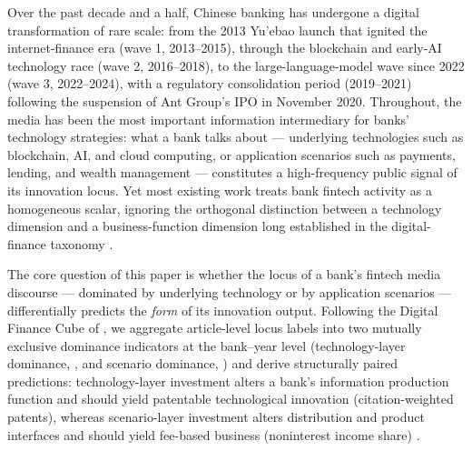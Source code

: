 Over the past decade and a half, Chinese banking has undergone a digital transformation
of rare scale: from the 2013 Yu'ebao launch that ignited the internet-finance era (wave
1, 2013--2015), through the blockchain and early-AI technology race (wave 2, 2016--2018),
to the large-language-model wave since 2022 (wave 3, 2022--2024), with a regulatory
consolidation period (2019--2021) following the suspension of Ant Group's IPO in November
2020. Throughout, the media has been the most important information intermediary for
banks' technology strategies: what a bank talks about — underlying technologies such as
blockchain, AI, and cloud computing, or application scenarios such as payments, lending,
and wealth management — constitutes a high-frequency public signal of its innovation
locus. Yet most existing work treats bank fintech activity as a homogeneous scalar,
ignoring the orthogonal distinction between a technology dimension and a
business-function dimension long established in the digital-finance taxonomy
\parencite{gomber2017cube,gomber2018fintech}.

The core question of this paper is whether the locus of a bank's fintech media discourse
— dominated by underlying technology or by application scenarios — differentially
predicts the \emph{form} of its innovation output. Following the Digital Finance Cube of
\textcite{gomber2017cube}, we aggregate article-level locus labels into two mutually
exclusive dominance indicators at the bank--year level (technology-layer dominance,
, and scenario dominance, ) and
derive structurally paired predictions: technology-layer investment alters a bank's
information production function and should yield patentable technological innovation
(citation-weighted patents), whereas scenario-layer investment alters distribution and
product interfaces and should yield fee-based business (noninterest income share)
\parencite{yoo2010layered,boot2021fintech}.

